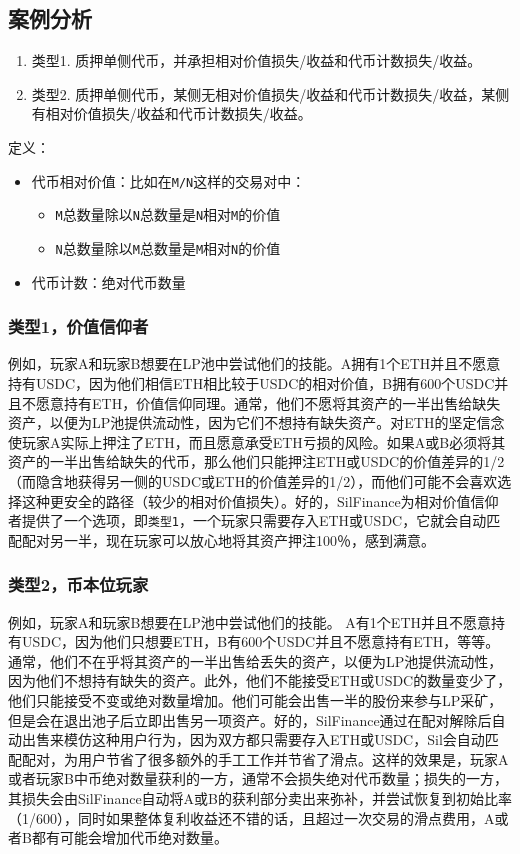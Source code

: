 \documentclass[11pt,letterpaper]{article}
\begin{document}
\begin{multicols}{2}
\subsection{案例分析}
\begin{enumerate}
  \item 类型1. 质押单侧代币，并承担相对价值损失/收益和代币计数损失/收益。
  \item 类型2. 质押单侧代币，某侧无相对价值损失/收益和代币计数损失/收益，某侧有相对价值损失/收益和代币计数损失/收益。
\end{enumerate}
定义：
\begin{itemize}
  \item 代币相对价值：比如在\texttt{M/N}这样的交易对中：
  \begin{itemize}
    \item \texttt{M}总数量除以\texttt{N}总数量是\texttt{N}相对\texttt{M}的价值
    \item \texttt{N}总数量除以\texttt{M}总数量是\texttt{M}相对\texttt{N}的价值
  \end{itemize}
  \item 代币计数：绝对代币数量
\end{itemize}

\subsubsection{类型1，价值信仰者}
例如，玩家A和玩家B想要在LP池中尝试他们的技能。A拥有1个ETH并且不愿意持有USDC，因为他们相信ETH相比较于USDC的相对价值，B拥有600个USDC并且不愿意持有ETH，价值信仰同理。通常，他们不愿将其资产的一半出售给缺失资产，以便为LP池提供流动性，因为它们不想持有缺失资产。对ETH的坚定信念使玩家A实际上押注了ETH，而且愿意承受ETH亏损的风险。如果A或B必须将其资产的一半出售给缺失的代币，那么他们只能押注ETH或USDC的价值差异的1/2（而隐含地获得另一侧的USDC或ETH的价值差异的1/2），而他们可能不会喜欢选择这种更安全的路径（较少的相对价值损失）。好的，SilFinance为相对价值信仰者提供了一个选项，即\texttt{类型1}，一个玩家只需要存入ETH或USDC，它就会自动匹配配对另一半，现在玩家可以放心地将其资产押注100％，感到满意。

\subsubsection{类型2，币本位玩家}
例如，玩家A和玩家B想要在LP池中尝试他们的技能。
 A有1个ETH并且不愿意持有USDC，因为他们只想要ETH，B有600个USDC并且不愿意持有ETH，等等。通常，他们不在乎将其资产的一半出售给丢失的资产，以便为LP池提供流动性，因为他们不想持有缺失的资产。此外，他们不能接受ETH或USDC的数量变少了，他们只能接受不变或绝对数量增加。他们可能会出售一半的股份来参与LP采矿，但是会在退出池子后立即出售另一项资产。好的，SilFinance通过在配对解除后自动出售来模仿这种用户行为，因为双方都只需要存入ETH或USDC，Sil会自动匹配配对，为用户节省了很多额外的手工工作并节省了滑点。这样的效果是，玩家A或者玩家B中币绝对数量获利的一方，通常不会损失绝对代币数量；损失的一方，其损失会由SilFinance自动将A或B的获利部分卖出来弥补，并尝试恢复到初始比率（1/600），同时如果整体复利收益还不错的话，且超过一次交易的滑点费用，A或者B都有可能会增加代币绝对数量。

\end{multicols}
\end{document}
